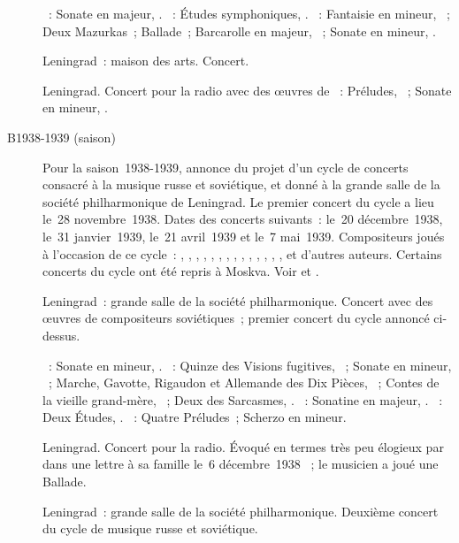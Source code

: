 \begin{description}
 \textsc{\Beethoven{}}~: Sonate en \kD majeur, .
 \textsc{\Schumann{}}~: Études symphoniques, .
 \textsc{\Chopin{}}~: Fantaisie en \kF mineur, ~; Deux Mazurkas~;
 Ballade~; Barcarolle en \kF \Sharp majeur, ~; Sonate en \kB \Flat
 mineur, .
 \item[\DateWithWeekDay{1938-10-16}]
 Leningrad~: maison des arts.
 Concert.
 \item[\DateWithWeekDay{1938-10-20}]
 Leningrad.
 Concert pour la radio avec des œuvres de \Scriabine{}~: Préludes,
 ~; Sonate  en \kF \Sharp mineur, .
 \item[B1938-1939 (saison)]
 Pour la saison~1938-1939, annonce du projet d'un cycle de concerts consacré
 à la musique russe et soviétique, et donné à la grande salle de la société
 philharmonique de Leningrad.
 Le premier concert du cycle a lieu le~28 novembre~1938.
 Dates des concerts suivants~: le~20 décembre~1938, le~31 janvier~1939,
 le~21 avril~1939 et le~7 mai~1939.
 Compositeurs joués à l'occasion de ce cycle~: \DBortnianski{}, \MGlinka{},
 \MMoussorgski{}, \ABorodine{}, \ARubinstein{}, \PTchaikovski{},
 \MBalakirev{}, \SLiapounov{}, \ALiadov{}, \AGlazounov{}, \AAleksandrov{},
 \SFeinberg{}, \NMiaskovski{}, \VChtcherbatchiov{}, \DKabalevski{} et
 d'autres auteurs.
 Certains concerts du cycle ont été repris à Moskva.
 Voir \citet[p.~160]{Nekrasova08} et \citet[p.~413]{Scriabine}.
 \item[\DateWithWeekDay{1938-11-28}]
 Leningrad~: grande salle de la société philharmonique.
 Concert avec des œuvres de compositeurs soviétiques~; premier concert du
 cycle annoncé ci-dessus.

 \textsc{\Miaskovski{}}~: Sonate en \kF \Sharp mineur, .
 \textsc{\Prokofiev{}}~: Quinze des Visions fugitives, ~; Sonate en
 \kA mineur, ~; Marche, Gavotte, Rigaudon et Allemande des Dix
 Pièces, ~; Contes de la vieille grand-mère, ~; Deux des
 Sarcasmes, .
 \textsc{\Kabalevski{}}~: Sonatine en \kC majeur,  .
 \textsc{\BogdanovBerezovsky{}}~: Deux Études, .
 \textsc{\Goltz{}}~: Quatre Préludes~; Scherzo en \kE mineur.
 \item[\DateWithWeekDay{1938-12-05}]
 Leningrad.
 Concert pour la radio.
 Évoqué en termes très peu élogieux par \VSofronitsky{} dans une lettre à sa
 famille le~6 décembre~1938 \citep[p.~25]{Kogan08}~; le musicien a joué une
 Ballade.
 \item[\DateWithWeekDay{1938-12-20}]
 Leningrad~: grande salle de la société philharmonique.
 Deuxième concert du cycle de musique russe et soviétique.


\end{description}
